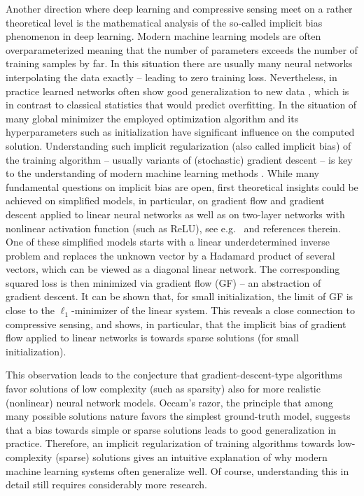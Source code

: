 \documentclass{svproc}
\newcommand{\corr}[1]{#1}
\newcommand{\0}{\boldsymbol{0}}
\newcommand{\1}{\boldsymbol{1}}
\begin{document}
Another direction where deep learning and compressive sensing meet on a rather theoretical level is the mathematical analysis of the so-called implicit bias phenomenon in deep learning. Modern machine learning models are often overparameterized meaning that the number of parameters exceeds the number of training samples by far. In this situation there are usually many neural networks interpolating the data exactly -- leading to zero training loss. Nevertheless, in practice learned networks often show good generalization to new data \cite{zhang2017understanding}, which is in contrast to classical statistics that would predict overfitting. In the situation of many global minimizer the employed optimization algorithm and its hyperparameters such as initialization have significant influence on the computed solution. Understanding such implicit regularization (also called implicit bias) of the training algorithm -- usually variants of (stochastic) gradient descent -- is key to the understanding of modern machine learning methods \cite{neyshabur2015,gunasekar_characterizing_2020}. While many fundamental questions on implicit bias are open, first theoretical insights could be achieved on simplified models, in particular, on gradient flow and gradient descent applied to linear neural networks \cite{gunasekar2017implicit,arora2019implicit,chou2023more,chou2024gradient,even2023s,pesme2023saddle}
as well as on two-layer networks with nonlinear activation function (such as ReLU), see e.g.\ \cite{boursier2024} and references therein.
One of these simplified models starts with a linear underdetermined inverse problem and replaces the unknown vector by a Hadamard product of several vectors, which can be viewed as a diagonal linear network. The corresponding \corr{squared} loss is then minimized via gradient flow (GF) -- an abstraction of gradient descent. It can be shown that\corr{,} for small initialization\corr{,} the limit of \corr{GF} is close to the $\ell_1$-minimizer of the \corr{linear} system. This reveals a close connection to compressive sensing, and shows\corr{,} in particular, that the implicit bias of gradient flow applied to linear networks is towards sparse solutions (for small initialization).

This observation leads to the conjecture that \corr{gradient-descent-type algorithms} favor \corr{solutions} of low complexity (such as sparsity) also for more realistic (nonlinear) neural network models. \corr{Occam's razor, the principle} that among many possible solutions nature favors the simplest ground-truth model\corr{,} suggests that a bias towards \corr{simple or sparse solutions} leads to good generalization in practice. Therefore, an implicit regularization of training algorithms towards low-complexity (sparse) solutions gives an intuitive explanation of why modern machine learning systems often generalize well. Of course, understanding this in detail still requires \corr{considerably more research}.
\end{document}
